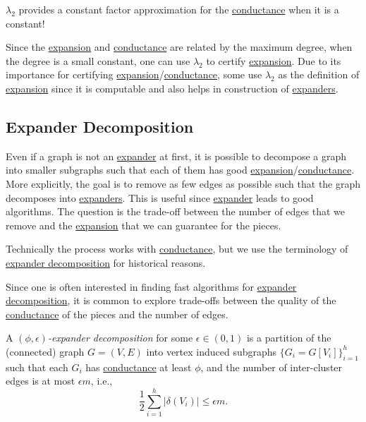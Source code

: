 \begin{remark}
	\(\lambda _2\) provides a constant factor approximation for the \hyperref[def:conductance]{conductance} when it is a constant!
\end{remark}

Since the \hyperref[def:expansion]{expansion} and \hyperref[def:conductance]{conductance} are related by the maximum degree, when the degree is a small constant, one can use \(\lambda _2\) to certify \hyperref[def:expansion]{expansion}. Due to its importance for certifying \hyperref[def:expansion]{expansion}/\hyperref[def:conductance]{conductance}, some use \(\lambda _2\) as the definition of \hyperref[def:expansion]{expansion} since it is computable and also helps in construction of \hyperref[def:expander]{expanders}.

\subsection{Expander Decomposition}
Even if a graph is not an \hyperref[def:expander]{expander} at first, it is possible to decompose a graph into smaller subgraphs such that each of them has good \hyperref[def:expansion]{expansion}/\hyperref[def:conductance]{conductance}. More explicitly, the goal is to remove as few edges as possible such that the graph decomposes into \hyperref[def:expander]{expanders}. This is useful since \hyperref[def:expander]{expander} leads to good algorithms. The question is the trade-off between the number of edges that we remove and the \hyperref[def:expansion]{expansion} that we can guarantee for the pieces.

\begin{notation}
	Technically the process works with \hyperref[def:conductance]{conductance}, but we use the terminology of \hyperref[def:expander-decomposition]{expander decomposition} for historical reasons.
\end{notation}

Since one is often interested in finding fast algorithms for \hyperref[def:expander-decomposition]{expander decomposition}, it is common to explore trade-offs between the quality of the \hyperref[def:conductance]{conductance} of the pieces and the number of edges.

\begin{definition}\label{def:expander-decomposition}
	A \emph{\((\phi, \epsilon )\)-expander decomposition} for some \(\epsilon \in (0, 1)\) is a partition of the (connected) graph \(G = (V, E)\) into vertex induced subgraphs \(\{ G_i = G[V_i] \}_{i=1}^{h} \) such that each \(G_i\) has \hyperref[def:conductance]{conductance} at least \(\phi \), and the number of inter-cluster edges is at most \(\epsilon m\), i.e.,
	\[
		\frac{1}{2} \sum_{i=1}^{h} \lvert \delta (V_i) \rvert
		\leq \epsilon m.
	\]
\end{definition}